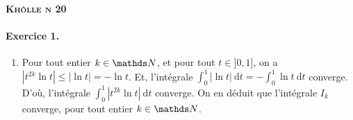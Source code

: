 \documentclass[a4paper]{article}
\def\khollenum{20}
\begin{document}
	\begin{center}
		\bfseries\scshape\Huge Khôlle n \khollenum
	\end{center}

	\paragraph{Exercice 1.}
	\begin{enumerate}
		\item Pour tout entier $k \in \N$, et pour tout $t \in {]0,1]}$, on a $|t^{2k} \ln t| \le |{\ln t}| = -\ln t$. Et, l'intégrale $\int_{0}^{1} |{\ln t}|~\mathrm{d}t = -\int_{0}^{1} \ln t~\mathrm{d}t$ converge.
			D'où, l'intégrale $\int_{0}^{1} |t^{2k} \ln t|~\mathrm{d}t$ converge.
			On en déduit que l'intégrale $I_k$ converge, pour tout entier $k \in \N$.


\end{enumerate}
\end{document}
